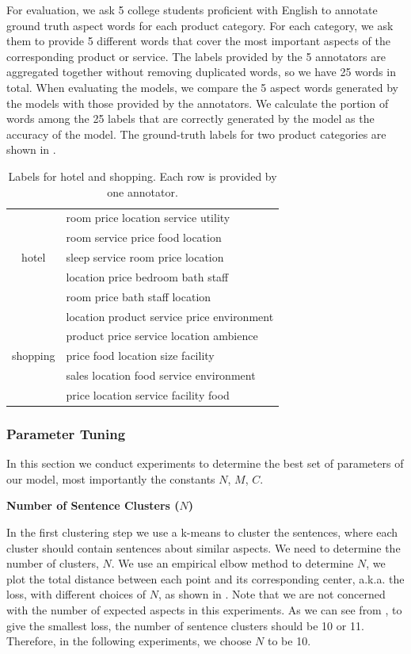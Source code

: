 For evaluation, we ask 5 college students proficient with English 
to annotate ground truth
aspect words for each product category. For each category, 
we ask them to provide 5 different words that cover the most important 
aspects of the corresponding product or service. The labels provided by the
5 annotators are aggregated together without removing duplicated words, 
so we have 25 words in total. 
When evaluating the models, 
we compare the 5 aspect words generated by the models with those provided 
by the annotators. 
We calculate the portion of words among the 25 labels that 
are correctly generated by the model as the accuracy of the model.
The ground-truth labels for two product categories are shown 
in .


\begin{table}[th]
\centering
\caption{Labels for hotel and shopping. Each row is provided by one annotator.}
\label{table:labels}
\begin{tabular}{|c|l|}
\hline
\multirow{5}{*}{hotel}
& room price location service utility \\
& room service price food location  \\
& sleep service room price location  \\
& location price bedroom bath staff  \\
& room price bath staff location  \\\hline

\multirow{5}{*}{shopping}
& location product service price environment \\
& product price service location ambience \\
& price food location size facility \\
& sales location food service environment \\
& price location service facility food \\\hline
\end{tabular}
\end{table}

\subsubsection{Parameter Tuning}

In this section we conduct experiments to determine the best set of
parameters of our model, most importantly the constants $N$, $M$, $C$.

\textbf{Number of Sentence Clusters ($N$)}

In the first clustering step we use a k-means to cluster the sentences,
where each cluster should contain sentences about similar aspects.
We need to determine the number of clusters, $N$.
We use an empirical elbow method to determine $N$, 
we plot the total distance between each point and its corresponding center,
a.k.a. the loss, with different choices of $N$, 
as shown in .
Note that we are not concerned with the number of expected aspects 
in this experiments. 
As we can see from ,
to give the smallest loss, the number of sentence clusters should be
10 or 11.  Therefore, in the following experiments, we choose $N$ to be 10.

